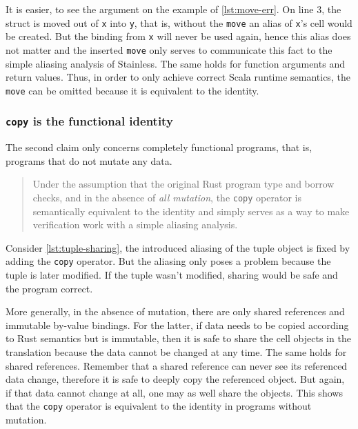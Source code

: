 It is easier, to see the argument on the example of \autoref{lst:move-err}. On
line 3, the struct is moved out of \lstinline!x! into \lstinline!y!, that is,
without the \lstinline!move! an alias of \lstinline!x!'s cell would be created.
But the binding from \lstinline!x! will never be used again, hence this alias
does not matter and the inserted \lstinline!move! only serves to communicate
this fact to the simple aliasing analysis of Stainless. The same holds for
function arguments and return values. Thus, in order to only achieve correct
Scala runtime semantics, the \lstinline!move! can be omitted because it is
equivalent to the identity.

\subsubsection{\texorpdfstring{\texttt{copy} is the functional
identity}{copy is the functional identity}}

The second claim only concerns completely functional programs, that is, programs
that do not mutate any data.

\begin{quote}
Under the assumption that the original Rust program type and borrow checks, and
in the absence of \emph{all mutation}, the \lstinline!copy! operator is
semantically equivalent to the identity and simply serves as a way to make
verification work with a simple aliasing analysis.
\end{quote}

Consider \autoref{lst:tuple-sharing}, the introduced aliasing of the tuple
object is fixed by adding the \lstinline!copy! operator. But the aliasing only
poses a problem because the tuple is later modified. If the tuple wasn't
modified, sharing would be safe and the program correct.

More generally, in the absence of mutation, there are only shared references and
immutable by-value bindings. For the latter, if data needs to be copied
according to Rust semantics but is immutable, then it is safe to share the cell
objects in the translation because the data cannot be changed at any time. The
same holds for shared references. Remember that a shared reference can never see
its referenced data change, therefore it is safe to deeply copy the referenced
object. But again, if that data cannot change at all, one may as well share the
objects. This shows that the \lstinline!copy! operator is equivalent to the
identity in programs without mutation.


